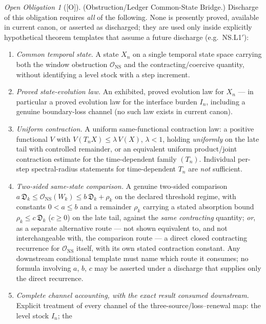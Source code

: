 \documentclass[12pt,oneside]{amsbook}
\theoremstyle{plain}
\theoremstyle{definition}
\theoremstyle{remark}
\newtheorem{obligation}[theorem]{Open Obligation}
\newcommand{\status}[1]{\textup{[#1]}}
\begin{document}
\begin{obligation}[\status{O}]\label{ob:NS-common-state-bridge}
\textup{(Obstruction/Ledger Common-State Bridge.)}
Discharge of this obligation requires \emph{all} of the following.
None is presently proved, available in current canon, or asserted as
discharged; they are used only inside explicitly hypothetical
theorem templates that assume a future discharge (e.g.\ NS.L1$'$):
\begin{enumerate}[label=\textup{(\alph*)}]
 \item \emph{Common temporal state.} A state $X_n$ on a single
 temporal state space carrying both the window obstruction
 $\mathcal{O}_{\mathrm{NS}}$ and the contracting/coercive
 quantity, without identifying a level stock with a step
 increment.
 \item \emph{Proved state-evolution law.} An exhibited, proved
 evolution law for $X_n$ --- in particular a proved evolution law
 for the interface burden $I_n$, including a genuine boundary-loss
 channel (no such law exists in current canon).
 \item \emph{Uniform contraction.} A uniform same-functional
 contraction law: a positive functional $V$ with
 $V(T_n X) \leq \lambda\,V(X)$, $\lambda < 1$, holding
 \emph{uniformly} on the late tail with controlled remainder, or
 an equivalent uniform product/joint contraction estimate for the
 time-dependent family $(T_n)$. Individual per-step
 spectral-radius statements for time-dependent $T_n$ are
 \emph{not} sufficient.
 \item \emph{Two-sided same-state comparison.} A genuine
 two-sided comparison
 $a\,\mathfrak{D}_k \leq \mathcal{O}_{\mathrm{NS}}(W_k)
 \leq b\,\mathfrak{D}_k + \rho_k$
 on the declared threshold regime, with constants $0 < a \leq b$
 and a remainder $\rho_k$ carrying a stated absorption bound
 $\rho_k \leq c\,\mathfrak{D}_k$ ($c \geq 0$) on the late tail,
 against the \emph{same contracting} quantity; \emph{or}, as a
 separate alternative route --- not shown equivalent to, and not
 interchangeable with, the comparison route --- a direct closed
 contracting recurrence for $\mathcal{O}_{\mathrm{NS}}$ itself,
 with its own stated contraction constant. Any downstream
 conditional template must name which route it consumes; no
 formula involving $a$, $b$, $c$ may be asserted under a discharge
 that supplies only the direct recurrence.
 \item \emph{Complete channel accounting, with the exact result
 consumed downstream.} Explicit treatment of every channel of the
 three-source/loss--renewal map: the level stock $I_n$; the

\end{enumerate}
\end{obligation}
\end{document}
